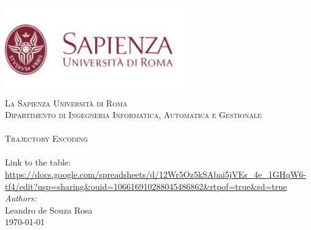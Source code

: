 \begin{titlepage}

\center 
 
\includegraphics[width=0.6\textwidth]{images/logo.png}\\[1cm] 	
\textsc{\LARGE La Sapienza Università di Roma}\\[1cm]

\textsc{\Large Dipartimento di Ingegneria Informatica, Automatica e Gestionale}\\[0.2cm]
\vfill
\HRule \\[0.8cm]					%
\textsc{\Huge Trajectory Encoding}\\[1cm]%
\HRule \\
\large Link to the table:\\ \url{https://docs.google.com/spreadsheets/d/12Wr5Oz5kSAbai5jVEs_4e_1GHqW6-tf4/edit?usp=sharing&ouid=106616910288045486862&rtpof=true&sd=true}
\HRule \\[2cm]
\large
\emph{Authors:}\\
Leandro de Souza Rosa \\[1.5cm]													%
{\large \today}\\[5cm]

\vfill 
\end{titlepage}

